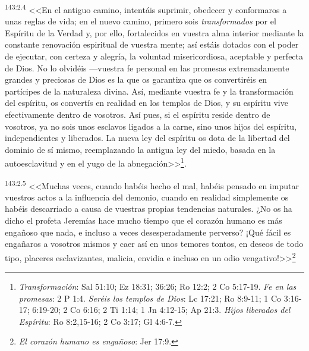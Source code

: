 \par 
\textsuperscript{143:2.4} <<En el antiguo camino, intentáis suprimir, obedecer y conformaros a unas reglas de vida; en el nuevo camino, primero sois \textit{transformados} por el Espíritu de la Verdad y, por ello, fortalecidos en vuestra alma interior mediante la constante renovación espiritual de vuestra mente; así estáis dotados con el poder de ejecutar, con certeza y alegría, la voluntad misericordiosa, aceptable y perfecta de Dios. No lo olvidéis ---vuestra fe personal en las promesas extremadamente grandes y preciosas de Dios es la que os garantiza que os convertiréis en partícipes de la naturaleza divina. Así, mediante vuestra fe y la transformación del espíritu, os convertís en realidad en los templos de Dios, y su espíritu vive efectivamente dentro de vosotros. Así pues, si el espíritu reside dentro de vosotros, ya no sois unos esclavos ligados a la carne, sino unos hijos del espíritu, independientes y liberados. La nueva ley del espíritu os dota de la libertad del dominio de sí mismo, reemplazando la antigua ley del miedo, basada en la autoesclavitud y en el yugo de la abnegación>>\footnote{\textit{Transformación}: Sal 51:10; Ez 18:31; 36:26; Ro 12:2; 2 Co 5:17-19. \textit{Fe en las promesas}: 2 P 1:4. \textit{Seréis los templos de Dios}: Lc 17:21; Ro 8:9-11; 1 Co 3:16-17; 6:19-20; 2 Co 6:16; 2 Ti 1:14; 1 Jn 4:12-15; Ap 21:3. \textit{Hijos liberados del Espíritu}: Ro 8:2,15-16; 2 Co 3:17; Gl 4:6-7.}.

\par 
\textsuperscript{143:2.5} <<Muchas veces, cuando habéis hecho el mal, habéis pensado en imputar vuestros actos a la influencia del demonio, cuando en realidad simplemente os habéis descarriado a causa de vuestras propias tendencias naturales. ¿No os ha dicho el profeta Jeremías hace mucho tiempo que el corazón humano es más engañoso que nada, e incluso a veces desesperadamente perverso? ¡Qué fácil es engañaros a vosotros mismos y caer así en unos temores tontos, en deseos de todo tipo, placeres esclavizantes, malicia, envidia e incluso en un odio vengativo!>>\footnote{\textit{El corazón humano es engañoso}: Jer 17:9.}

